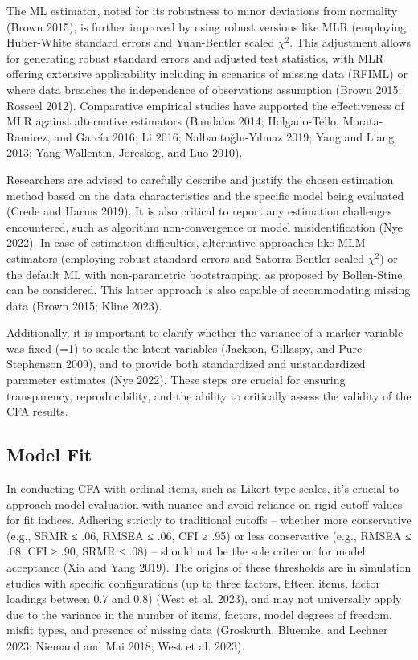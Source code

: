 \documentclass[
  a4paper,
]{article}
\begin{document}
The ML estimator, noted for its robustness to minor deviations from
normality (Brown 2015), is further improved by using robust versions
like MLR (employing Huber-White standard errors and Yuan-Bentler scaled
\(\chi^2\). This adjustment allows for generating robust standard errors
and adjusted test statistics, with MLR offering extensive applicability
including in scenarios of missing data (RFIML) or where data breaches
the independence of observations assumption (Brown 2015; Rosseel 2012).
Comparative empirical studies have supported the effectiveness of MLR
against alternative estimators (Bandalos 2014; Holgado-Tello,
Morata-Ramirez, and García 2016; Li 2016; Nalbantoğlu-Yılmaz 2019; Yang
and Liang 2013; Yang-Wallentin, Jöreskog, and Luo 2010).

Researchers are advised to carefully describe and justify the chosen
estimation method based on the data characteristics and the specific
model being evaluated (Crede and Harms 2019). It is also critical to
report any estimation challenges encountered, such as algorithm
non-convergence or model misidentification (Nye 2022). In case of
estimation difficulties, alternative approaches like MLM estimators
(employing robust standard errors and Satorra-Bentler scaled \(\chi^2\))
or the default ML with non-parametric bootstrapping, as proposed by
Bollen-Stine, can be considered. This latter approach is also capable of
accommodating missing data (Brown 2015; Kline 2023).

Additionally, it is important to clarify whether the variance of a
marker variable was fixed (=1) to scale the latent variables (Jackson,
Gillaspy, and Purc-Stephenson 2009), and to provide both standardized
and unstandardized parameter estimates (Nye 2022). These steps are
crucial for ensuring transparency, reproducibility, and the ability to
critically assess the validity of the CFA results.

\subsection{Model Fit}\label{model-fit}

In conducting CFA with ordinal items, such as Likert-type scales, it's
crucial to approach model evaluation with nuance and avoid reliance on
rigid cutoff values for fit indices. Adhering strictly to traditional
cutoffs -- whether more conservative (e.g., SRMR ≤ .06, RMSEA ≤ .06, CFI
≥ .95) or less conservative (e.g., RMSEA ≤ .08, CFI ≥ .90, SRMR ≤ .08)
-- should not be the sole criterion for model acceptance (Xia and Yang
2019). The origins of these thresholds are in simulation studies with
specific configurations (up to three factors, fifteen items, factor
loadings between 0.7 and 0.8) (West et al. 2023), and may not
universally apply due to the variance in the number of items, factors,
model degrees of freedom, misfit types, and presence of missing data
(Groskurth, Bluemke, and Lechner 2023; Niemand and Mai 2018; West et al.
2023).
\end{document}
